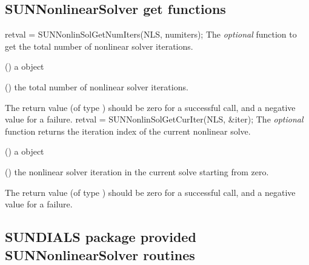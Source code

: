 \subsection{SUNNonlinearSolver get functions}
\label{ss:sunnonlinsol_getfn}
{
  retval = SUNNonlinSolGetNumIters(NLS, numiters);
}
{
  The \textit{optional} function  to get
  the total number of nonlinear solver iterations.
}
{
  \begin{args}[numiters]
  \item[NLS] ()
    a {\sunnonlinsol} object
  \item[numiters] ()
    the total number of nonlinear solver iterations.
  \end{args}
}
{
  The return value  (of type ) should be zero for a
  successful call, and a negative value for a failure.
}
{}
{
  retval = SUNNonlinSolGetCurIter(NLS, \&iter);
}
{
  The \textit{optional} function  returns
  the iteration index of the current nonlinear solve.
}
{
  \begin{args}[numiters]
  \item[NLS] ()
    a {\sunnonlinsol} object
  \item[iter] ()
    the nonlinear solver iteration in the current solve starting from
    zero.
  \end{args}
}
{
  The return value  (of type ) should be zero for a
  successful call, and a negative value for a failure.
}
{}

\subsection{SUNDIALS package provided SUNNonlinearSolver routines}
\label{ss:sunnonlinsol_sunsuppliedfn}

